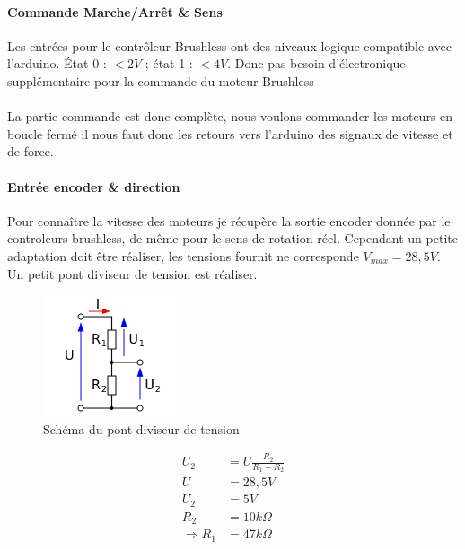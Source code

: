 \documentclass[11pt]{article}
\begin{document}
\paragraph{Commande Marche/Arrêt \& Sens \\}

Les entrées pour le contrôleur Brushless ont des niveaux logique compatible avec l'arduino. État 0 : $<2V$ ; état 1 : $<4V$. Donc pas besoin d'électronique supplémentaire pour la commande du moteur Brushless\\
\\
La partie commande est donc complète, nous voulons commander les moteurs en boucle fermé il nous faut donc les retours vers l'arduino des signaux de vitesse et de force.

\paragraph{Entrée encoder \& direction}

Pour connaître la vitesse des moteurs je récupère la sortie encoder donnée par le controleurs brushless, de même pour le sens de rotation réel. Cependant un petite adaptation doit être réaliser, les tensions fournit ne corresponde $V_{max} = 28,5V$. Un petit pont diviseur de tension est réaliser.

\begin{figure}[!h]
    \centering
    \includegraphics[width=150px]{Pont_diviseur.png}
    \caption{Schéma du pont diviseur de tension}
\end{figure}

\begin{equation}
 	\begin{split}
		U_{2} &= U \frac{R_{2}}{R_{1}+R_{2}}\\
		U &= 28,5 V\\
		U_{2} &= 5V\\
		R_{2} &= 10k\Omega\\
		\Rightarrow R_{1} &= 47k\Omega\\
	\end{split}
\end{equation}
\end{document}

